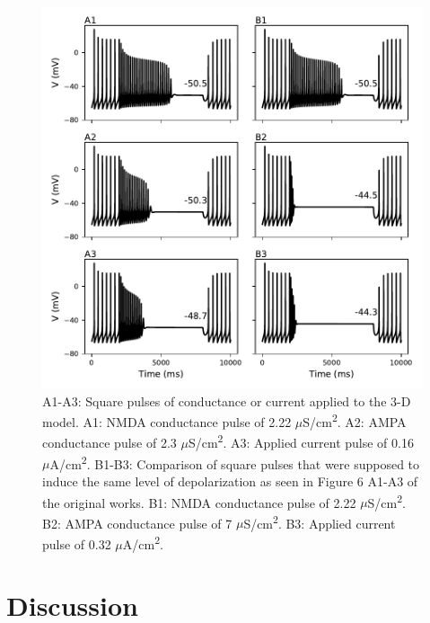 \begin{figure}
	\centering
	\includegraphics[scale=0.7]{../figures/figure_6.pdf}
	\caption{A1-A3: Square pulses of conductance or current applied to the 3-D model. A1: NMDA conductance pulse of 2.22 $\mu$S/cm\textsuperscript{2}. A2: AMPA conductance pulse of 2.3 $\mu$S/cm\textsuperscript{2}. A3: Applied current pulse of 0.16 $\mu$A/cm\textsuperscript{2}. B1-B3: Comparison of square pulses that were supposed to induce the same level of depolarization as seen in Figure 6 A1-A3 of the original works. B1: NMDA conductance pulse of 2.22 $\mu$S/cm\textsuperscript{2}. B2: AMPA conductance pulse of 7 $\mu$S/cm\textsuperscript{2}. B3: Applied current pulse of 0.32 $\mu$A/cm\textsuperscript{2}. }
	\label{fig:6}
\end{figure}


\section{Discussion}

